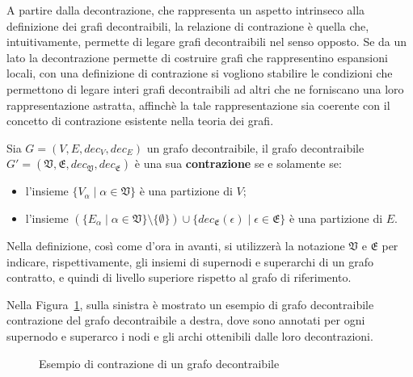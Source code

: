 
\label{subsec:contrazioni}

A partire dalla decontrazione, che rappresenta un aspetto intrinseco alla definizione dei grafi decontraibili,
la relazione di contrazione \`e quella che, intuitivamente, permette di legare grafi decontraibili nel senso
opposto.
Se da un lato la decontrazione permette di costruire grafi che rappresentino espansioni locali, con una
definizione di contrazione si vogliono stabilire le condizioni che permettono di legare interi grafi decontraibili
ad altri che ne forniscano una loro rappresentazione astratta, affinch\`e la tale rappresentazione
sia coerente con il concetto di contrazione esistente nella teoria dei grafi.

\begin{definition}
    Sia $G = (V, E, dec_V, dec_E)$ un grafo decontraibile, il grafo decontraibile \\
    $G\mathcal{'} = (\mathfrak{V}, \mathfrak{E}, dec_{\mathfrak{V}}, dec_{\mathfrak{E}})$ \`e una sua
    \textbf{contrazione} se e solamente se:
        \begin{itemize}
            \item l'insieme $\{V_\alpha \mid \alpha \in \mathfrak{V}\}$ \`e una partizione di $V$;
            \item l'insieme $(\{E_\alpha \mid \alpha \in \mathfrak{V}\} \setminus \{ \emptyset \}) \cup
                \{ dec_{\mathfrak{E}}(\epsilon) \mid \epsilon \in \mathfrak{E}\}$ \`e una partizione di $E$.
        \end{itemize}
\end{definition}

Nella definizione, cos\`{i} come d'ora in avanti, si utilizzer\`a la notazione $\mathfrak{V}$ e $\mathfrak{E}$ per
indicare, rispettivamente, gli insiemi di supernodi e superarchi di un grafo contratto, e quindi di livello
superiore rispetto al grafo di riferimento.

Nella Figura~\ref{fig:contraction-example}, sulla sinistra \`e mostrato un esempio di grafo decontraibile
contrazione del grafo decontraibile a destra, dove sono annotati per ogni supernodo e superarco
i nodi e gli archi ottenibili dalle loro decontrazioni. \newline

\begin{figure}
    \centering
    
    \caption{Esempio di contrazione di un grafo decontraibile}
    \label{fig:contraction-example}
\end{figure}

